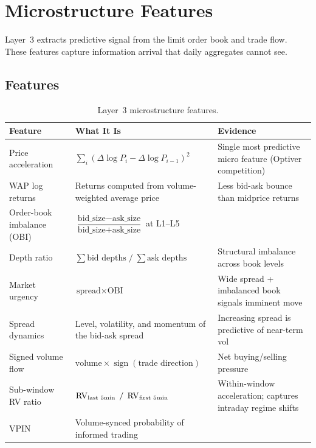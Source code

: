 \chapter{Microstructure Features}
\label{ch:microstructure}

Layer~3 extracts predictive signal from the limit order book and trade flow.
These features capture information arrival that daily aggregates cannot see.

\section{Features}
\label{sec:micro-features}

\begin{table}[htbp]
\centering
\caption{Layer~3 microstructure features.}
\label{tab:micro-features}
\small
\begin{tabular}{@{}p{3.2cm}p{5.8cm}p{4.5cm}@{}}
\toprule
\textbf{Feature} & \textbf{What It Is} & \textbf{Evidence} \\
\midrule
Price acceleration &
  $\sum_i (\Delta \log P_i - \Delta \log P_{i-1})^2$ &
  Single most predictive micro feature (Optiver competition) \\[6pt]
WAP log returns &
  Returns computed from volume-weighted average price &
  Less bid-ask bounce than midprice returns \\[6pt]
Order-book imbalance (OBI) &
  $\dfrac{\text{bid\_size} - \text{ask\_size}}{\text{bid\_size} + \text{ask\_size}}$ at L1--L5 &
  \citep{CarteaJaimungalPenalva2015} \\[6pt]
Depth ratio &
  $\sum \text{bid depths}\; / \;\sum \text{ask depths}$ &
  Structural imbalance across book levels \\[6pt]
Market urgency &
  $\text{spread} \times \text{OBI}$ &
  Wide spread + imbalanced book signals imminent move \\[6pt]
Spread dynamics &
  Level, volatility, and momentum of the bid-ask spread &
  Increasing spread is predictive of near-term vol \\[6pt]
Signed volume flow &
  $\text{volume} \times \operatorname{sign}(\text{trade direction})$ &
  Net buying/selling pressure \\[6pt]
Sub-window RV ratio &
  $\operatorname{RV}_{\text{last 5min}}\; / \;\operatorname{RV}_{\text{first 5min}}$ &
  Within-window acceleration; captures intraday regime shifts \\[6pt]
VPIN &
  Volume-synced probability of informed trading &
  \citep{EasleyLopezOHara2012} \\
\bottomrule
\end{tabular}
\end{table}


